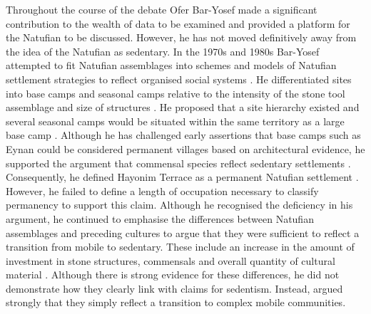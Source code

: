 \documentclass[%
	]{ijsra}
\begin{document}
Throughout the course of the debate Ofer Bar-Yosef made a significant contribution to the wealth of data to be examined and provided a platform for the Natufian to be discussed. However, he has not moved definitively away from the idea of the Natufian as sedentary. 
In the 1970s and 1980s Bar-Yosef attempted to fit Natufian assemblages into schemes and models of Natufian settlement strategies to reflect organised social systems \parencite[25]{Bar-Yosef_1983}. 
He differentiated sites into base camps and seasonal camps relative to the intensity of the stone tool assemblage and size of structures \parencite[14]{Bar-Yosef_1983}. 
He proposed that a site hierarchy existed and several seasonal camps would be situated within the same territory as a large base camp \parencite[25]{Bar-Yosef_1983}. 
Although he has challenged early assertions that base camps such as Eynan could be considered permanent villages based on architectural evidence, he supported the argument that commensal species reflect sedentary settlements \parencite[5]{Bar-Yosef_1991}. 
Consequently, he defined Hayonim Terrace as a permanent Natufian settlement \parencite[25]{Bar-Yosef_1983}.  
However, he failed to define a length of occupation necessary to classify permanency to support this claim. Although he recognised the deficiency in his argument, he continued to emphasise the differences between Natufian assemblages and preceding cultures to argue that they were sufficient to reflect a transition from mobile to sedentary. 
These include an increase in the amount of investment in stone structures, commensals and overall quantity of cultural material \parencite[6]{Bar-Yosef_1991}. Although there is strong evidence for these differences, he did not demonstrate how they clearly link with claims for sedentism. 
Instead, \textcite[56]{Shewan_2004} argued strongly that they simply reflect a transition to complex mobile communities. 
\end{document}
